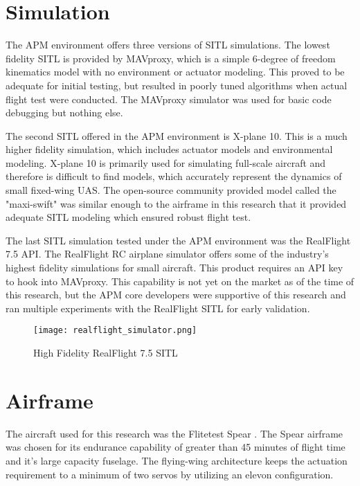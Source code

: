 \section{Simulation}
The \ac{APM} environment offers three versions of \ac{SITL} simulations.  The lowest fidelity \ac{SITL} is provided by MAVproxy, which is a simple 6-degree of freedom kinematics model with no environment or actuator modeling.  This proved to be adequate for initial testing, but resulted in poorly tuned algorithms when actual flight test were conducted.  The MAVproxy simulator was used for basic code debugging but nothing else.

The second \ac{SITL} offered in the \ac{APM} environment is X-plane 10.  This is a much higher fidelity simulation, which includes actuator models and environmental modeling.  X-plane 10 is primarily used for simulating full-scale aircraft and therefore is difficult to find models, which accurately represent the dynamics of small fixed-wing \ac{UAS}.  The open-source community provided model called the "maxi-swift" was similar enough to the airframe in this research that it provided adequate \ac{SITL} modeling which ensured robust flight test.

The last \ac{SITL} simulation tested under the \ac{APM} environment was the RealFlight 7.5 \ac{API}.  The RealFlight \ac{RC} airplane simulator offers some of the industry's highest fidelity simulations for small aircraft.  This product requires an \ac{API} key to hook into MAVproxy.  This capability is not yet on the market as of the time of this research, but the \ac{APM} core developers were supportive of this research and ran multiple experiments with the RealFlight \ac{SITL} for early validation.

\begin{figure}[h!]
 \centering
  \texttt{[image: realflight\_simulator.png]}
  \caption{High Fidelity RealFlight 7.5 \ac{SITL}}
  \label{fig:realflight_sitl}
\end{figure}


\section{Airframe}

The aircraft used for this research was the Flitetest Spear \cite{flitetest}.  The Spear airframe was chosen for its endurance capability of greater than 45 minutes of flight time and it's large capacity fuselage.  The flying-wing architecture keeps the actuation requirement to a minimum of two servos by utilizing an elevon configuration.  

